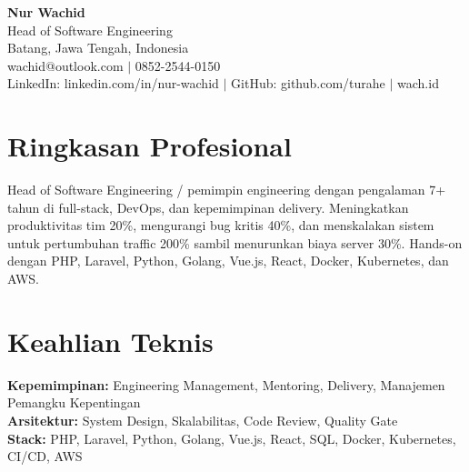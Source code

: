 \begin{center}
  {\LARGE\bfseries Nur Wachid}\\[3pt]
  Head of Software Engineering\\[2pt]
  Batang, Jawa Tengah, Indonesia\\[2pt]
  wachid@outlook.com $|$ 0852-2544-0150\\[1pt]
  LinkedIn: linkedin.com/in/nur-wachid $|$ GitHub: github.com/turahe $|$ wach.id
\end{center}
\section*{Ringkasan Profesional}
Head of Software Engineering / pemimpin engineering dengan pengalaman 7+ tahun di full-stack, DevOps, dan kepemimpinan delivery. Meningkatkan produktivitas tim 20\%, mengurangi bug kritis 40\%, dan menskalakan sistem untuk pertumbuhan traffic 200\% sambil menurunkan biaya server 30\%. Hands-on dengan PHP, Laravel, Python, Golang, Vue.js, React, Docker, Kubernetes, dan AWS.
\section*{Keahlian Teknis}
\textbf{Kepemimpinan:} Engineering Management, Mentoring, Delivery, Manajemen Pemangku Kepentingan\\[1pt]
\textbf{Arsitektur:} System Design, Skalabilitas, Code Review, Quality Gate\\[1pt]
\textbf{Stack:} PHP, Laravel, Python, Golang, Vue.js, React, SQL, Docker, Kubernetes, CI/CD, AWS
